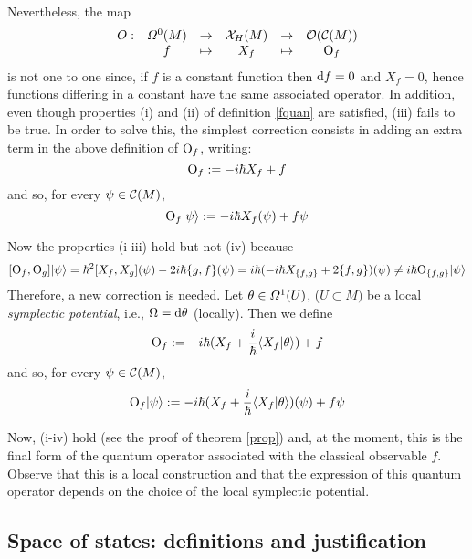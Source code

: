 \documentclass[12pt]{article}
\def\beq{\begin{equation}}
\def\eeq{\end{equation}}
\def\d{{\rm d}}
\def\C{{\cal C}}
\def\sta{|\psi \rangle }
\def\Op{{\rm O}}
\begin{document}
Nevertheless, the map
$$
\begin{array}{cccccc}
O:&{\mit\Omega}^0 (M)&\to &{\cal X}_H(M)&\to &{\cal O}(\C (M))
\\
&f& \mapsto &X_f& \mapsto &\Op_f
\end{array}
$$
is not one to one since,
if $f$ is a constant function
then $\d f = 0$ and $X_f=0$,
hence functions differing in a constant
have the same associated operator.
In addition, even though properties (i) and (ii) of definition
\ref{fquan}
are satisfied, (iii) fails to be true.
In order to solve this,
the simplest correction consists in adding
an extra term in the above definition of
$\Op_f$, writing:
$$
\Op_f := -i\hbar X_f + f
$$
and so, for every $\psi \in \C (M)$,
$$
\Op_f\sta := -i\hbar X_f(\psi) +f\psi
$$

Now the properties (i-iii) hold but not (iv) because $$
[\Op_f,\Op_g]\sta = \hbar^2 [X_f,X_g](\psi) - 2i\hbar \{ g,f\}
(\psi )= i\hbar (-i\hbar X_{\{ f,g\}} + 2\{ f,g\} )(\psi) \not=
i\hbar \Op_{\{ f,g\}}\sta $$ Therefore, a new correction is
needed. Let $\theta \in {\mit\Omega}^1(U)$, ($U\subset M)$ be a
local {\it symplectic potential}, i.e., $\Omega = \d \theta$
(locally). Then we define \beq \Op_f := -i\hbar (X_f +
\frac{i}{\hbar}\langle X_f |\theta \rangle )+f \label{oper} \eeq
and so, for every $\psi \in \C (M)$, \beq \Op_f\sta := -i\hbar
(X_f + \frac{i}{\hbar}\langle X_f |\theta \rangle ) (\psi )+f\psi
\label{opersta} \eeq

Now, (i-iv) hold (see the proof of theorem \ref{prop})
and, at the moment, this is the final form of the quantum operator
associated with the classical observable $f$.
Observe that this is a local construction
and that the expression of this quantum operator
depends on the choice of the local symplectic potential.



\subsection{Space of states: definitions and justification}
\end{document}
